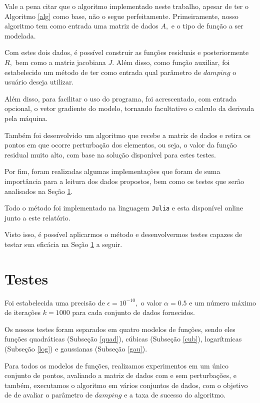 \documentclass[12pt,a4paper]{article}
\newcounter{ex}[section]
\begin{document}
	 Vale a pena citar que o algoritmo implementado neste trabalho, apesar de ter o Algoritmo \ref{alg} como base, não o segue perfeitamente. Primeiramente, nosso algoritmo tem como entrada uma matriz de dados $A,$ e o tipo de função a ser modelada.
	 
	 Com estes dois dados, é possível construir as funções residuais e posteriormente $R,$ bem como a matriz jacobiana $J.$ Além disso, como função auxiliar, foi estabelecido um método de ter como entrada qual parâmetro de $damping$ o usuário deseja utilizar.
	 
 	Além disso, para facilitar o uso do programa, foi acrescentado, com entrada opcional, o vetor gradiente do modelo, tornando facultativo o calculo da derivada pela máquina.
 	
 	Também foi desenvolvido um algoritmo que recebe a matriz de dados e retira os pontos em que ocorre perturbação dos elementos, ou seja, o valor da função residual muito alto, com base na solução disponível para estes testes.
	 	
	 Por fim, foram realizadas algumas implementações que foram de suma importância para a leitura dos dados propostos, bem como os testes que serão analisados na Seção \ref{testes}.
	 
	 Todo o método foi implementado na linguagem \texttt{Julia} e esta disponível online junto a este relatório. 

	Visto isso, é possível aplicarmos o método e desenvolvermos testes capazes de testar sua eficácia na Seção \ref{testes} a seguir.
	
	\section{Testes}\label{testes}
	
	Foi estabelecida uma precisão de $\epsilon = 10^{-10},$ o valor $\alpha = 0.5$ e um número máximo de iterações $k=1000$ para cada conjunto de dados fornecidos.
	
	Os nossos testes foram separados em quatro modelos de funções, sendo eles funções quadráticas (Subseção \ref{quad}), cúbicas (Subseção \ref{cub}), logarítmicas (Subseção \ref{log}) e gaussianas (Subseção \ref{gau}).
	
	Para todos os modelos de funções, realizamos experimentos em um único conjunto de pontos, avaliando a matriz de dados com e sem
	perturbações, e também, executamos o algoritmo em vários conjuntos de dados, com o objetivo de de avaliar o parâmetro de $damping$ e a taxa de sucesso do algoritmo.
	
\end{document}
